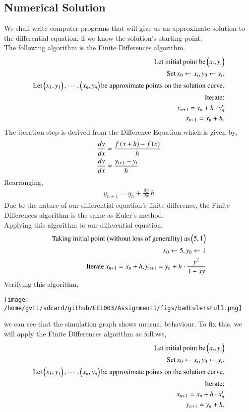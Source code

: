 \documentclass[journal]{IEEEtran}
\begin{document}
\subsection*{Numerical Solution}
We shall write computer programs that will give us an approximate solution to the differential equation, if we know the solution's starting point.\\
The following algorithm is the Finite Differences algorithm.
\begin{align*}
	\text{Let initial point be} \begin{pmatrix}x_i, y_i\end{pmatrix}&\\
	\text{Set}\, x_0\leftarrow x_i, y_0\leftarrow y_i. \\\text{Let} \begin{pmatrix}x_1, y_1\end{pmatrix}, \cdots, \begin{pmatrix}x_n, y_n\end{pmatrix} \text{be approximate points on the solution curve.}&\\
	\text{Iterate:} \\y_{n+1} = y_{n} + h \cdot y_n^{\prime} \\ x_{n+1} = x_n + h.&
\end{align*}
The iteration step is derived from the Difference Equation which is given by,
\begin{align}
	\frac{dy}{dx} &\approx \frac{f\left(x+h\right) -f\left(x\right)}{h}\\ 
	\frac{dy}{dx} &\approx \frac{y_{i+1} - y_i}{h}
\end{align}
Rearranging,
\begin{align}
	y_{n+1} = y_n + \frac{dy}{dx} \, h
\end{align}
Due to the nature of our differential equation's finite difference, the Finite Differences algorithm is the same as Euler's method.\\
Applying this algorithm to our differential equation,
\begin{align}
	\text{Taking initial point \ensuremath{\left(\text{without loss of generality}\right)} as} \begin{pmatrix}5, 1\end{pmatrix}\\
	x_0\leftarrow 5, y_0\leftarrow 1\\
	\text{Iterate}\, x_{n+1} = x_n + h, y_{n+1} = y_n + h \cdot \frac{y^2}{1-xy}
\end{align}
Verifying this algorithm,
\begin{center} 
	\texttt{[image: /home/gvt1/sdcard/github/EE1003/Assignment1/figs/badEulersFull.png]}  
\end{center}
we can see that the simulation graph shows unusual behaviour. To fix this, we will apply the Finite Differences algorithm as follows,
\begin{align*}
	\text{Let initial point be} \begin{pmatrix}x_i, y_i\end{pmatrix}&\\
	\text{Set}\, x_0\leftarrow x_i, y_0\leftarrow y_i. \\\text{Let} \begin{pmatrix}x_1, y_1\end{pmatrix}, \cdots, \begin{pmatrix}x_n, y_n\end{pmatrix} \text{be approximate points on the solution curve.}&\\
	\text{Iterate:}\\ x_{n+1} = x_{n} + h \cdot x_n^{\prime} \\ y_{n+1} = y_n + h.&
\end{align*}
\end{document}
